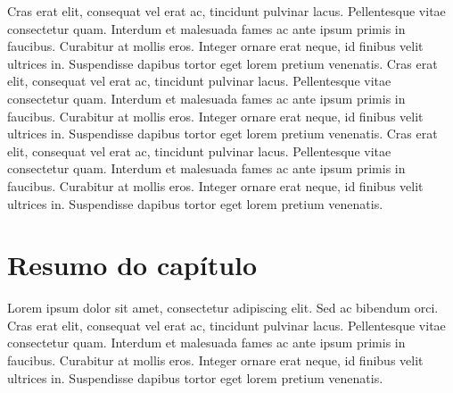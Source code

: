 \documentclass[./main.tex]{subfiles}
\begin{document}
\par Cras erat elit, consequat vel erat ac, tincidunt pulvinar lacus. Pellentesque vitae consectetur quam. Interdum et malesuada fames ac ante ipsum primis in faucibus. Curabitur at mollis eros. Integer ornare erat neque, id finibus velit ultrices in. Suspendisse dapibus tortor eget lorem pretium venenatis. Cras erat elit, consequat vel erat ac, tincidunt pulvinar lacus. Pellentesque vitae consectetur quam. Interdum et malesuada fames ac ante ipsum primis in faucibus. Curabitur at mollis eros. Integer ornare erat neque, id finibus velit ultrices in. Suspendisse dapibus tortor eget lorem pretium venenatis. Cras erat elit, consequat vel erat ac, tincidunt pulvinar lacus. Pellentesque vitae consectetur quam. Interdum et malesuada fames ac ante ipsum primis in faucibus. Curabitur at mollis eros. Integer ornare erat neque, id finibus velit ultrices in. Suspendisse dapibus tortor eget lorem pretium venenatis.


\clearpage

\section{Resumo do capítulo}

\par Lorem ipsum dolor sit amet, consectetur adipiscing elit. Sed ac bibendum orci. Cras erat elit, consequat vel erat ac, tincidunt pulvinar lacus. Pellentesque vitae consectetur quam. Interdum et malesuada fames ac ante ipsum primis in faucibus. Curabitur at mollis eros. Integer ornare erat neque, id finibus velit ultrices in. Suspendisse dapibus tortor eget lorem pretium venenatis.
\end{document}
